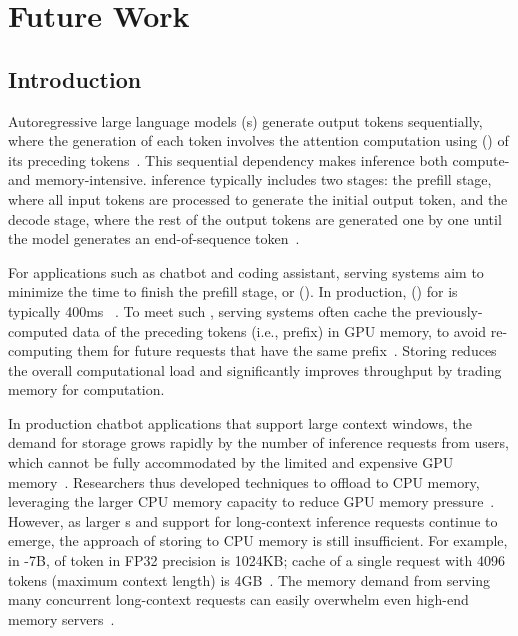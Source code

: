 \chapter{Future Work}
\label{chap:future}

\section{Introduction}
Autoregressive large language models (\llm{}s) generate output tokens sequentially, where the generation of each token involves the attention computation using \kvfull (\kv) of its preceding tokens~\cite{gpt1, gpt2, gpt3}. 
This sequential dependency makes \llm inference both compute- and memory-intensive.
\llm inference typically includes two stages: the prefill stage, where all input tokens are processed to generate the initial output token, and the decode stage, where the rest of the output tokens are generated one by one until the model generates an end-of-sequence token~\cite{agrawal2023sarathi,distserve,patel2024splitwise}. 


For applications such as chatbot and coding assistant, \llm serving systems aim to minimize the time to finish the prefill stage, or \ttftfull (\ttft).
In production, \slofull (\slo) for \ttft is typically 400ms ~\cite{distserve}.
To meet such \slo, \llm serving systems often cache the previously-computed \kv data of the preceding tokens (i.e., prefix) in GPU memory, to avoid re-computing them for future requests that have the same prefix~\cite{pagedattenion, distserve, memserve}. 
Storing \kvcache reduces the overall computational load and significantly improves throughput by trading memory for computation. 


In production chatbot applications that support large context windows, the demand for \kvcache storage grows rapidly by the number of inference requests from users, which cannot be fully accommodated  by the limited and expensive GPU memory~\cite{miao2023towards}.
Researchers thus developed techniques to offload \kvcache to CPU memory, leveraging the larger CPU memory capacity to reduce GPU memory pressure~\cite{memserve, cacheblend,sheng2023flexgen}. 
However, as larger \llm{}s and support for long-context inference requests continue to emerge, the approach of storing \kvcache to CPU memory is still insufficient. 
For example, in -7B, \kvcache of token in FP32 precision is 1024KB; \kv cache of a single request with 4096 tokens (maximum context length) is 4GB~\cite{llama2}.
The memory demand from serving many concurrent long-context requests can easily overwhelm even high-end memory servers~\cite{pagedattenion,liu2023cachegen}. 

